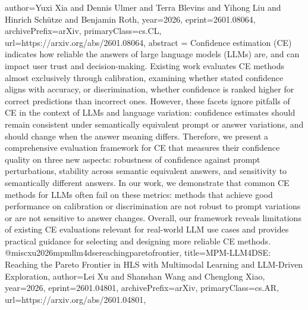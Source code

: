 {      author={Yuxi Xia and Dennis Ulmer and Terra Blevins and Yihong Liu and Hinrich Schütze and Benjamin Roth},
      year={2026},
      eprint={2601.08064},
      archivePrefix={arXiv},
      primaryClass={cs.CL},
      url={https://arxiv.org/abs/2601.08064},
      abstract = {Confidence estimation (CE) indicates how reliable the answers of large language models (LLMs) are, and can impact user trust and decision-making. Existing work evaluates CE methods almost exclusively through calibration, examining whether stated confidence aligns with accuracy, or discrimination, whether confidence is ranked higher for correct predictions than incorrect ones. However, these facets ignore pitfalls of CE in the context of LLMs and language variation: confidence estimates should remain consistent under semantically equivalent prompt or answer variations, and should change when the answer meaning differs. Therefore, we present a comprehensive evaluation framework for CE that measures their confidence quality on three new aspects: robustness of confidence against prompt perturbations, stability across semantic equivalent answers, and sensitivity to semantically different answers. In our work, we demonstrate that common CE methods for LLMs often fail on these metrics: methods that achieve good performance on calibration or discrimination are not robust to prompt variations or are not sensitive to answer changes. Overall, our framework reveals limitations of existing CE evaluations relevant for real-world LLM use cases and provides practical guidance for selecting and designing more reliable CE methods.}
}@misc{xu2026mpmllm4dsereachingparetofrontier,
      title={MPM-LLM4DSE: Reaching the Pareto Frontier in HLS with Multimodal Learning and LLM-Driven Exploration}, 
      author={Lei Xu and Shanshan Wang and Chenglong Xiao},
      year={2026},
      eprint={2601.04801},
      archivePrefix={arXiv},
      primaryClass={cs.AR},
      url={https://arxiv.org/abs/2601.04801},
}
